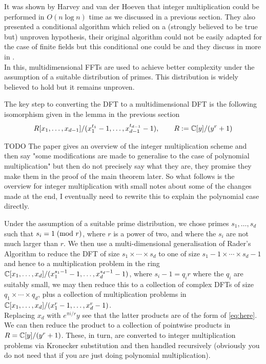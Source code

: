 It was shown by Harvey and van der Hoeven \cite{nlogn} that integer multiplication could be performed in $O(n\log n)$ time as we discussed in a previous section. They also presented a conditional algorithm which relied on a (strongly believed to be true but) unproven hypothesis, their original algorithm could not be easily adapted for the case of finite fields but this conditional one could be and they discuss in more in \cite{ffnlogn}.\\
In this, multidimensional FFTs are used to achieve better complexity under the assumption of a suitable distribution of primes. This distribution is widely believed to hold but it remains unproven.

The key step to converting the DFT to a multidimensional DFT is the following isomorphism given in the lemma in the previous section
\begin{equation}\label{eq:here}
    R[x_1, \ldots, x_{d-1}] / (x_1^{t_1} - 1, \ldots, x_{d-1}^{t_{d-1}} - 1), \qquad R := {\mathbb C}[y]/(y^r + 1)
\end{equation}

TODO The paper gives an overview of the integer multiplication scheme and then say "some modifications are made to generalise to the case of polynomial multiplication" but then do not precisely say what they are, they promise they make them in the proof of the main theorem later. So what follows is the overview for integer multiplication with small notes about some of the changes made at the end, I eventually need to rewrite this to explain the polynomial case directly.
\medskip

Under the assumption of a suitable prime distribution, we chose primes $s_1, \ldots, s_d$ such that $s_i = 1 \;(\textrm{mod } r)$, where $r$ is a power of two, and where the $s_i$ are not much larger than $r$. We then use a multi-dimensional generalisation of Rader's Algorithm to reduce the DFT of size $s_1 \times \cdots \times s_d$ to one of size $s_1-1 \times \cdots \times s_d-1$ and hence to a multiplication problem in the ring ${\mathbb C}[x_1, \ldots, x_d] / (x_1^{s_1 - 1} - 1, \ldots, x_d^{s_d - 1} - 1)$, where $s_i - 1 = q_i r$ where the $q_i$ are suitably small, we may then reduce this to a collection of complex DFTs of size $q_1 \times \cdots \times q_d$, plus a collection of multiplication problems in ${\mathbb C}[x_1, \ldots, x_d] / (x_1^r - 1, \ldots, x_d^r - 1)$. \\
Replacing $x_d$ with $e^{\pi i / r}y$ see that the latter products are of the form of \ref{eq:here}.  We can then reduce the product to a collection of pointwise products in $R = {\mathbb C}[y] / (y^r + 1)$. These, in turn, are converted to integer multiplication problems via Kronecker substitution and then handled recursively (obviously you do not need that if you are just doing polynomial multiplication).

